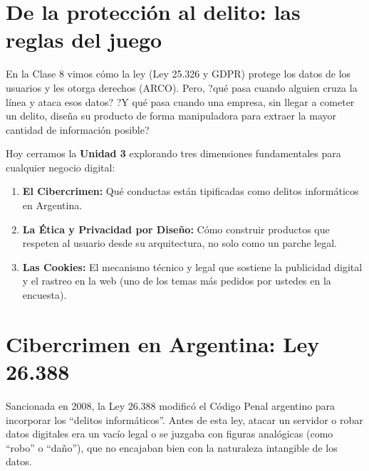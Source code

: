 \documentclass[12pt,a4paper]{article}
\begin{document}
\tableofcontents
\newpage

\section{De la protecci\'on al delito: las reglas del juego}

En la Clase 8 vimos c\'omo la ley (Ley 25.326 y GDPR) protege los datos de los usuarios y les otorga derechos (ARCO). Pero, ?qu\'e pasa cuando alguien cruza la l\'inea y ataca esos datos? ?Y qu\'e pasa cuando una empresa, sin llegar a cometer un delito, dise\~na su producto de forma manipuladora para extraer la mayor cantidad de informaci\'on posible?

Hoy cerramos la \textbf{Unidad 3} explorando tres dimensiones fundamentales para cualquier negocio digital:
\begin{enumerate}[leftmargin=2em]
    \item \textbf{El Cibercrimen:} Qu\'e conductas est\'an tipificadas como delitos inform\'aticos en Argentina.
    \item \textbf{La \'Etica y Privacidad por Dise\~no:} C\'omo construir productos que respeten al usuario desde su arquitectura, no solo como un parche legal.
    \item \textbf{Las Cookies:} El mecanismo t\'ecnico y legal que sostiene la publicidad digital y el rastreo en la web (uno de los temas m\'as pedidos por ustedes en la encuesta).
\end{enumerate}

\newpage
\section{Cibercrimen en Argentina: Ley 26.388}

Sancionada en 2008, la Ley 26.388 modific\'o el C\'odigo Penal argentino para incorporar los ``delitos inform\'aticos''. Antes de esta ley, atacar un servidor o robar datos digitales era un vac\'io legal o se juzgaba con figuras anal\'ogicas (como ``robo'' o ``da\~no''), que no encajaban bien con la naturaleza intangible de los datos.
\end{document}
